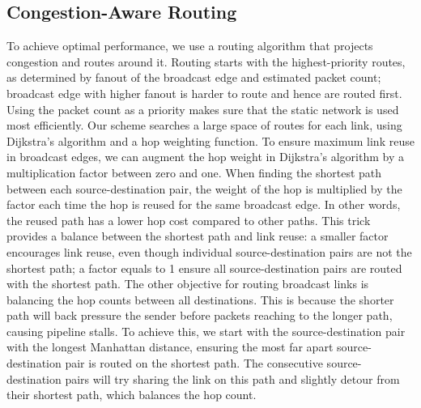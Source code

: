 \subsection{Congestion-Aware Routing} \label{sec:route}
To achieve optimal performance, we use a routing algorithm that projects congestion and routes around it. 
Routing starts with the highest-priority routes, as determined by fanout of the broadcast edge and
estimated packet count; broadcast edge with higher fanout is harder to route and hence are routed
first.
Using the packet count as a priority makes sure that the static network is used most efficiently.
Our scheme searches a large space of routes for each link, using Dijkstra's algorithm \cite{dijkstra} and a hop weighting function.
To ensure maximum link reuse in broadcast edges, we can augment the hop weight in Dijkstra's
algorithm by a multiplication factor between zero and one. 
When finding the shortest path between each source-destination pair, the weight of the hop is
multiplied by the factor each time the hop is reused for the same broadcast edge.
In other words, the reused path has a lower hop cost compared to other paths.
This trick provides a balance between the shortest path and link reuse: a smaller factor encourages link
reuse, even though individual source-destination pairs are not the shortest path; a factor equals to 1 ensure all source-destination pairs are routed with the shortest path.
The other objective for routing broadcast links is balancing the hop counts between all
destinations. This is because the shorter path will back pressure the sender before packets reaching to the longer path, causing pipeline stalls.
To achieve this, we start with the source-destination pair with the longest Manhattan distance, ensuring
the most far apart source-destination pair is routed on the shortest path.
The consecutive source-destination pairs will try sharing the link on this path and slightly detour from
their shortest path, which balances the hop count.

